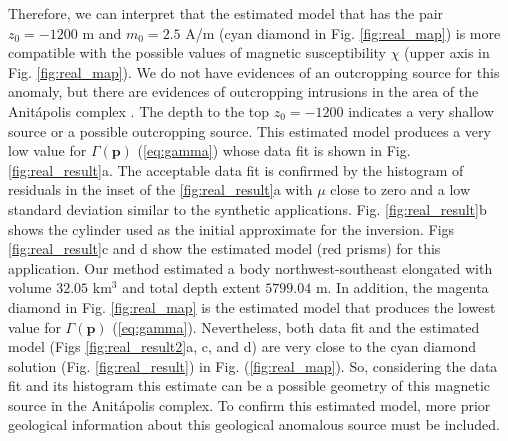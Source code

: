 Therefore, we can interpret that the estimated model that has the pair $z_0 = -1200$ m and $m_0 = 2.5$ A/m (cyan diamond in Fig. \ref{fig:real_map}) is more compatible with the possible values of magnetic susceptibility $ \chi $ (upper axis in Fig. \ref{fig:real_map}). We do not have evidences of an outcropping source for this anomaly, but there are evidences of outcropping intrusions in the area of the Anitápolis complex \cite[]{gibson-1999}. The depth to the top $z_0 = -1200$ indicates a very shallow source or a possible outcropping source. This estimated model produces a very low value for $ \Gamma(\mathbf{p}) $ (\ref{eq:gamma}) whose data fit is shown in Fig. \ref{fig:real_result}a. The acceptable data fit is confirmed by the histogram of residuals in the inset of the \ref{fig:real_result}a with $ \mu $ close to zero and a low standard deviation similar to the synthetic applications. Fig. \ref{fig:real_result}b shows the cylinder used as the initial approximate for the inversion. Figs \ref{fig:real_result}c and d show the estimated model (red prisms) for this application. Our method estimated a body northwest-southeast elongated with volume $ 32.05 $ km$ ^3 $ and total depth extent $ 5799.04 $ m. In addition, the magenta diamond in Fig. \ref{fig:real_map} is the estimated model that produces the lowest value for $ \Gamma(\mathbf{p}) $ (\ref{eq:gamma}). Nevertheless, both data fit and the estimated model (Figs \ref{fig:real_result2}a, c, and d) are very close to the cyan diamond solution (Fig. \ref{fig:real_result}) in Fig. (\ref{fig:real_map}). So, considering the data fit and its histogram this estimate can be a possible geometry of this magnetic source in the Anitápolis complex. To confirm this estimated model, more prior geological information about this geological anomalous source must be included.